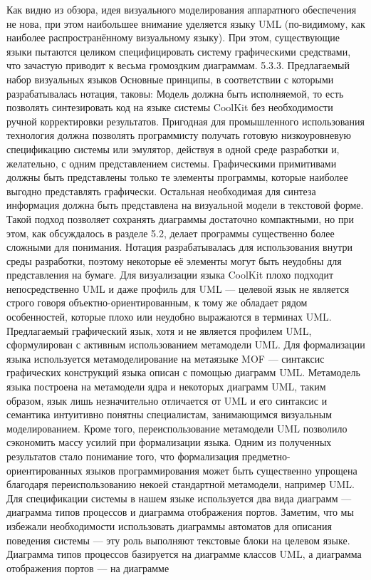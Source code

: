Как видно из обзора, идея визуального моделирования аппаратного обеспечения не нова, при этом наибольшее внимание уделяется языку UML (по-видимому, как наиболее распространённому визуальному языку). При этом, существующие языки пытаются целиком специфицировать систему графическими средствами, что зачастую приводит к весьма громоздким диаграммам.
5.3.3. Предлагаемый набор визуальных языков
Основные принципы, в соответствии с которыми разрабатывалась нотация, таковы:
Модель должна быть исполняемой, то есть позволять синтезировать код на языке системы CoolKit без необходимости ручной корректировки результатов. Пригодная для промышленного использования технология должна позволять программисту получать готовую низкоуровневую спецификацию системы или эмулятор, действуя в одной среде разработки и, желательно, с одним представлением системы.
Графическими примитивами должны быть представлены только те элементы программы, которые наиболее выгодно представлять графически. Остальная необходимая для синтеза информация должна быть представлена на визуальной модели в текстовой форме. Такой подход позволяет сохранять диаграммы достаточно компактными, но при этом, как обсуждалось в разделе 5.2, делает программы существенно более сложными для понимания.
Нотация разрабатывалась для использования внутри среды разработки, поэтому некоторые её элементы могут быть неудобны для представления на бумаге.
Для визуализации языка CoolKit плохо подходит непосредственно UML и даже профиль для UML --- целевой язык не является строго говоря объектно-ориентированным, к тому же обладает рядом особенностей, которые плохо или неудобно выражаются в терминах UML. Предлагаемый графический язык, хотя и не является профилем UML, сформулирован с активным использованием метамодели UML. Для формализации языка используется метамоделирование на метаязыке MOF --- синтаксис графических конструкций языка описан с помощью диаграмм UML. Метамодель языка построена на метамодели ядра и некоторых диаграмм UML, таким образом, язык лишь незначительно отличается от UML и его синтаксис и семантика интуитивно понятны специалистам, занимающимся визуальным моделированием. Кроме того, переиспользование метамодели UML позволило сэкономить массу усилий при формализации языка. Одним из полученных результатов стало понимание того, что формализация предметно-ориентированных языков программирования может быть существенно упрощена благодаря переиспользованию некоей стандартной метамодели, например UML.
Для спецификации системы в нашем языке используется два вида диаграмм --- диаграмма типов процессов и диаграмма отображения портов. Заметим, что мы избежали необходимости использовать диаграммы автоматов для описания поведения системы --- эту роль выполняют текстовые блоки на целевом языке. Диаграмма типов процессов базируется на диаграмме классов UML, а диаграмма отображения портов --- на диаграмме
